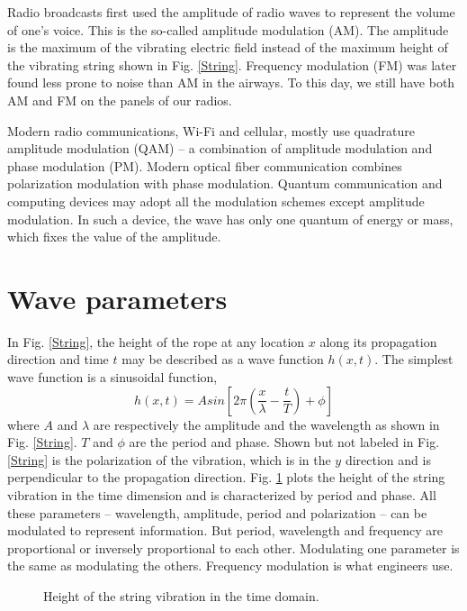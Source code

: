 \documentclass[oneside, letter, 12pt]{book}
\begin{document}
Radio broadcasts first used the amplitude of radio waves to represent the volume of one's voice. This is the so-called amplitude modulation (AM). The amplitude is the maximum of the vibrating electric field instead of the maximum height of the vibrating string shown in Fig. \ref{String}. Frequency modulation (FM) was later found less prone to noise than AM in the airways. To this day, we still have both AM and FM on the panels of our radios.

Modern radio communications, Wi-Fi and cellular, mostly use quadrature amplitude modulation (QAM) -- a combination of amplitude modulation and phase modulation (PM). Modern optical fiber communication combines polarization modulation with phase modulation. Quantum communication and computing devices may adopt all the modulation schemes except amplitude modulation. In such a device, the wave has only one quantum of energy or mass, which fixes the value of the amplitude.

\section{Wave parameters}
In Fig. \ref{String}, the height of the rope at any location $x$ along its propagation direction and time $t$ may be described as a wave function $h(x,t)$. The simplest wave function is a sinusoidal function,
\begin{equation}\label{e-hWave}
    h(x,t) = A sin[2\pi (\frac x \lambda - \frac t T) +\phi]
\end{equation}
where $A$ and $\lambda$ are respectively the amplitude and the wavelength as shown in Fig. \ref{String}. $T$ and $\phi$ are the period and phase. Shown but not labeled in Fig. \ref{String} is the polarization of the vibration, which is in the $y$ direction and is perpendicular to the propagation direction. Fig. \ref{Wave} plots the height of the string vibration in the time dimension and is characterized by period and phase. All these parameters -- wavelength, amplitude, period and polarization -- can be modulated to represent information. But period, wavelength and frequency are proportional or inversely proportional to each other. Modulating one parameter is the same as modulating the others. Frequency modulation is what engineers use.

\begin{figure}[ht]\label{Wave}
\caption{Height of the string vibration in the time domain.}
\end{figure}
\end{document}
